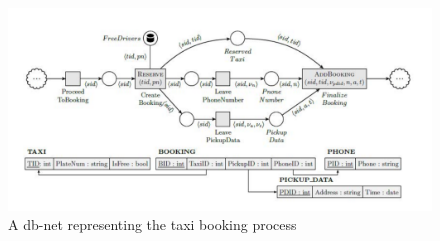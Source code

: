 \begin{figure}[!htbp]
	\centering
	\includegraphics[scale = 0.8]{DBN_Taxi_Example.pdf}
	\caption{A db-net representing the taxi booking process}
	\label{fig:DBN_Taxi_Example}
\end{figure}

